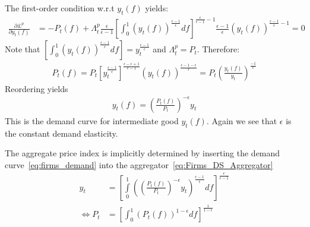 \begin{enumerate}
The first-order condition w.r.t \(y_t(f)\) yields:
\begin{align}
\frac{\partial \pounds^{p} }{\partial y_t(f)} & = -P_t(f) + \Lambda_{t}^p \frac{\epsilon}{\epsilon-1} {\left[\int_{0}^1 {(y_t(f))}^{\frac{\epsilon-1}{\epsilon}}df\right]}^{\frac{\epsilon}{\epsilon-1}-1} \frac{\epsilon-1}{\epsilon} {(y_t(f))}^{\frac{\epsilon-1}{\epsilon}-1} = 0
\label{eq:Firms_Relative_Demand}
\end{align}
Note that \(\left[\int_{0}^1 {(y_t(f))}^{\frac{\epsilon-1}{\epsilon}}df\right] = y_t^{\frac{\epsilon-1}{\epsilon}}\) and \(\Lambda_{t}^p=P_t\).
Therefore:
\begin{align}
	P_t(f) = P_t {\left[y_t^{\frac{\epsilon-1}{\epsilon}}\right]}^{\frac{\epsilon-\epsilon+1}{\epsilon-1}} {(y_t(f))}^{\frac{\epsilon-1-\epsilon}{\epsilon}} = P_t {\left(\frac{y_t(f)}{y_t}\right)}^{\frac{-1}{\epsilon}}
\end{align}
Reordering yields
\begin{align}
	y_t(f) = {\left(\frac{P_t(f)}{P_t}\right)}^{-\epsilon} y_t \label{eq:firms_demand}
\end{align}
This is the demand curve for intermediate good \(y_t(f)\).
Again we see that \(\epsilon \) is the constant demand elasticity.
	
The aggregate price index is implicitly determined by inserting the demand curve~\eqref{eq:firms_demand} into the aggregator~\eqref{eq:Firms_DS_Aggregator}
\begin{align}
	y_t &= {\left[\int\limits_0^1 {\left({\left(\frac{P_t(f)}{P_t}\right)}^{-\epsilon} y_t\right)}^{\frac{\epsilon-1}{\epsilon}}df\right]}^{\frac{\epsilon}{\epsilon-1}}
\\
\Leftrightarrow
	P_t &= {\left[\int_{0}^{1} {(P_t(f))}^{1-\epsilon}df\right]}^{\frac{1}{1-\epsilon}} \label{eq:Firms_DS_Pricing}
\end{align}


\end{enumerate}
